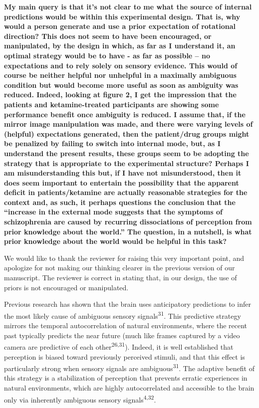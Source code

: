 \documentclass[
]{article}
\begin{document}
\textbf{My main query is that it's not clear to me what the source of
internal predictions would be within this experimental design. That is,
why would a person generate and use a prior expectation of rotational
direction? This does not seem to have been encouraged, or manipulated,
by the design in which, as far as I understand it, an optimal strategy
would be to have - as far as possible -- no expectations and to rely
solely on sensory evidence. This would of course be neither helpful nor
unhelpful in a maximally ambiguous condition but would become more
useful as soon as ambiguity was reduced. Indeed, looking at figure 2, I
get the impression that the patients and ketamine-treated participants
are showing some performance benefit once ambiguity is reduced. I assume
that, if the mirror image manipulation was made, and there were varying
levels of (helpful) expectations generated, then the patient/drug groups
might be penalized by failing to switch into internal mode, but, as I
understand the present results, these groups seem to be adopting the
strategy that is appropriate to the experimental structure? Perhaps I am
misunderstanding this but, if I have not misunderstood, then it does
seem important to entertain the possibility that the apparent deficit in
patients/ketamine are actually reasonable strategies for the context
and, as such, it perhaps questions the conclusion that the ``increase in
the external mode suggests that the symptoms of schizophrenia are caused
by recurring dissociations of perception from prior knowledge about the
world.'' The question, in a nutshell, is what prior knowledge about the
world would be helpful in this task?}

We would like to thank the reviewer for raising this very important
point, and apologize for not making our thinking clearer in the previous
version of our manuscript. The reviewer is correct in stating that, in
our design, the use of priors is not encouraged or manipulated.

Previous research has shown that the brain uses anticipatory predictions
to infer the most likely cause of ambiguous sensory
signals\textsuperscript{31}. This predictive strategy mirrors the
temporal autocorrelation of natural environments, where the recent past
typically predicts the near future (much like frames captured by a video
camera are predictive of each other\textsuperscript{26,31}). Indeed, it
is well established that perception is biased toward previously
perceived stimuli, and that this effect is particularly strong when
sensory signals are ambiguous\textsuperscript{31}. The adaptive benefit
of this strategy is a stabilization of perception that prevents erratic
experiences in natural environments, which are highly autocorrelated and
accessible to the brain only via inherently ambiguous sensory
signals\textsuperscript{4,32}.
\end{document}
